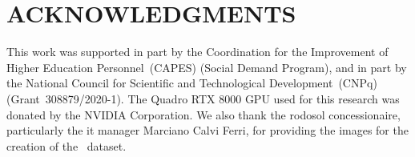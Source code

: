 \section*{\uppercase{Acknowledgments}}

This work was supported in part by the Coordination for the Improvement of Higher Education Personnel~(CAPES) (Social Demand Program), and in part by the National Council for Scientific and Technological Development~(CNPq) (Grant~308879/2020-1).
The Quadro RTX $8000$ GPU used for this research was donated by the NVIDIA Corporation.
We also thank the \acrfull*{rodosol} concessionaire, particularly the \gls*{it} manager Marciano Calvi Ferri, for providing the images for the creation of the \dataset~dataset.